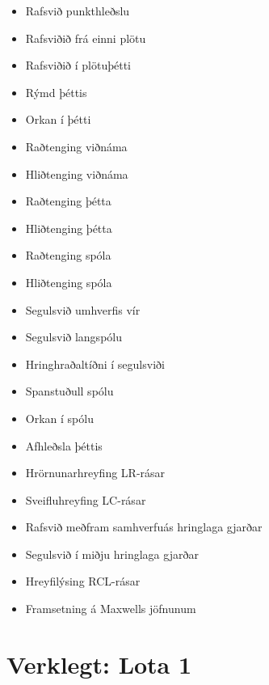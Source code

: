 \begin{multicols}{3}
\begin{itemize}
    \item Rafsvið punkthleðslu
    \item Rafsviðið frá einni plötu
    \item Rafsviðið í plötuþétti
    \item Rýmd þéttis
    \item Orkan í þétti
    \item Raðtenging viðnáma
    \item Hliðtenging viðnáma
    \item Raðtenging þétta
    \item Hliðtenging þétta
    \item Raðtenging spóla
    \item Hliðtenging spóla
    \item Segulsvið umhverfis vír
    \item Segulsvið langspólu
    \item Hringhraðaltíðni í segulsviði
    \item Spanstuðull spólu
    \item Orkan í spólu
    \item Afhleðsla þéttis
    \item Hrörnunarhreyfing LR-rásar
    \item Sveifluhreyfing LC-rásar
    \item Rafsvið meðfram samhverfuás hringlaga gjarðar
    \item Segulsvið í miðju hringlaga gjarðar
    \item Hreyfilýsing RCL-rásar
    \item Framsetning á Maxwells jöfnunum
\end{itemize}

\end{multicols}


\newpage




\section*{Verklegt: Lota 1}

